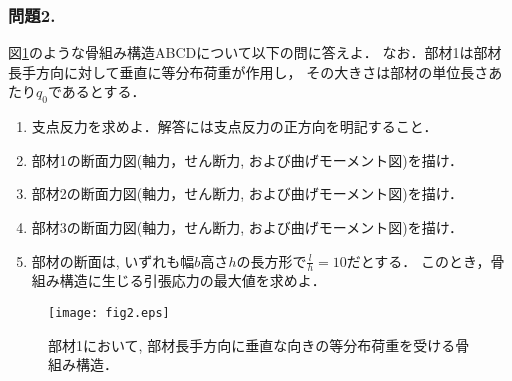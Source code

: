 \documentclass[10pt,a4j]{jarticle}
\begin{document}
\subsubsection*{問題2.}
図\ref{fig:fig2}のような骨組み構造ABCDについて以下の問に答えよ．
なお．部材1は部材長手方向に対して垂直に等分布荷重が作用し，
その大きさは部材の単位長さあたり$q_0$であるとする．
\begin{enumerate}
\item
	支点反力を求めよ．解答には支点反力の正方向を明記すること．
\item	
	部材1の断面力図(軸力，せん断力, および曲げモーメント図)を描け．
\item	
	部材2の断面力図(軸力，せん断力, および曲げモーメント図)を描け．
\item	
	部材3の断面力図(軸力，せん断力, および曲げモーメント図)を描け．
\item	
	部材の断面は, いずれも幅$b$高さ$h$の長方形で$\frac{l}{h}=10$だとする．
	このとき，骨組み構造に生じる引張応力の最大値を求めよ．
\end{enumerate}
\begin{figure}[h]
	\begin{center}
	\texttt{[image: fig2.eps]} 
	\end{center}
	\caption{
		部材1において, 部材長手方向に垂直な向きの等分布荷重を受ける骨組み構造．
	} 
	\label{fig:fig2}
\end{figure}
\end{document}
